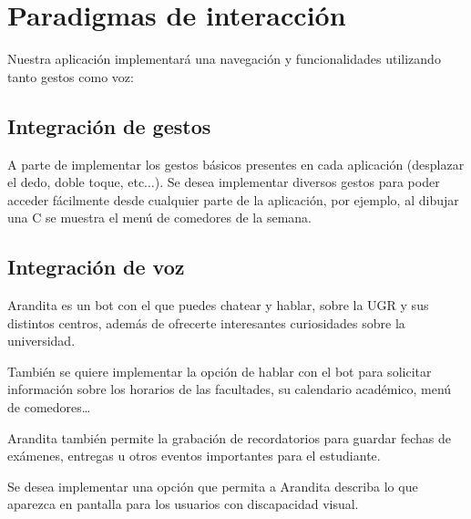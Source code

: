 \section{Paradigmas de interacción}

Nuestra aplicación implementará una navegación y funcionalidades utilizando tanto gestos como voz:

\subsection{Integración de gestos}
A parte de implementar los gestos básicos presentes en cada aplicación (desplazar el dedo, doble toque, etc$\ldots$). Se desea implementar diversos gestos para poder acceder fácilmente desde cualquier parte de la aplicación, por ejemplo, al dibujar una C se muestra el menú de comedores de la semana.

\subsection{Integración de voz}

Arandita es un bot con el que puedes chatear y hablar, sobre la UGR y sus distintos centros, además de ofrecerte interesantes curiosidades sobre la universidad.

También se quiere implementar la opción de hablar con el bot para solicitar  información sobre los horarios de las facultades, su calendario académico, menú de comedores…

Arandita también permite la grabación de recordatorios para guardar fechas de exámenes, entregas u otros eventos importantes para el estudiante.

Se desea implementar una opción que permita a Arandita describa lo que aparezca en pantalla para los usuarios con discapacidad visual.
